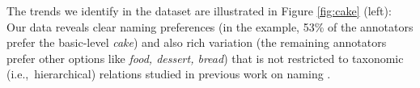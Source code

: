 The trends we identify in the dataset are illustrated in Figure \ref{fig:cake} (left): Our data reveals clear naming preferences (in the example, 53\% of the annotators prefer the basic-level  \textit{cake}) and also rich variation (the remaining annotators prefer other options like \textit{food, dessert, bread}) that is not restricted to taxonomic (i.e.,\ hierarchical) relations studied in previous work on naming \cite{Ordonez:2016,graf2016animal}.

